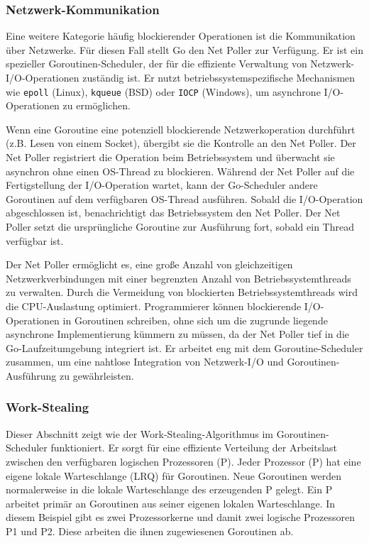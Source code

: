 \documentclass[fontsize=12pt,paper=a4,twoside=semi,parskip=half-,headsepline,headinclude]{scrreprt}
\begin{document}
\subsubsection{Netzwerk-Kommunikation}

Eine weitere Kategorie häufig blockierender Operationen ist die Kommunikation über Netzwerke. Für diesen Fall stellt Go den Net Poller\cite{netpoll2024} zur Verfügung. Er ist ein spezieller Goroutinen-Scheduler, der für die effiziente Verwaltung von Netzwerk-I/O-Operationen zuständig ist. Er nutzt betriebssystemspezifische Mechanismen wie \texttt{epoll} (Linux), \texttt{kqueue} (BSD) oder \texttt{IOCP} (Windows), um asynchrone I/O-Operationen zu ermöglichen.

Wenn eine Goroutine eine potenziell blockierende Netzwerkoperation durchführt (z.B. Lesen von einem Socket), übergibt sie die Kontrolle an den Net Poller. Der Net Poller registriert die Operation beim Betriebssystem und überwacht sie asynchron ohne einen OS-Thread zu blockieren. Während der Net Poller auf die Fertigstellung der I/O-Operation wartet, kann der Go-Scheduler andere Goroutinen auf dem verfügbaren OS-Thread ausführen. Sobald die I/O-Operation abgeschlossen ist, benachrichtigt das Betriebssystem den Net Poller. Der Net Poller setzt die ursprüngliche Goroutine zur Ausführung fort, sobald ein Thread verfügbar ist.

Der Net Poller ermöglicht es, eine große Anzahl von gleichzeitigen Netzwerkverbindungen mit einer begrenzten Anzahl von Betriebssystemthreads zu verwalten. Durch die Vermeidung von blockierten Betriebssystemthreads wird die CPU-Auslastung optimiert. Programmierer können blockierende I/O-Operationen in Goroutinen schreiben, ohne sich um die zugrunde liegende asynchrone Implementierung kümmern zu müssen, da der Net Poller tief in die Go-Laufzeitumgebung integriert ist. Er arbeitet eng mit dem Goroutine-Scheduler zusammen, um eine nahtlose Integration von Netzwerk-I/O und Goroutinen-Ausführung zu gewährleisten. 

\subsubsection{Work-Stealing}
\label{subsubsec:workstealing}

Dieser Abschnitt zeigt wie der Work-Stealing-Algorithmus im Goroutinen-Scheduler funktioniert. Er sorgt für eine effiziente Verteilung der Arbeitslast zwischen den verfügbaren logischen Prozessoren (P). Jeder Prozessor (P) hat eine eigene lokale Warteschlange (LRQ) für Goroutinen. Neue Goroutinen werden normalerweise in die lokale Warteschlange des erzeugenden P gelegt. Ein P arbeitet primär an Goroutinen aus seiner eigenen lokalen Warteschlange. In diesem Beispiel gibt es zwei Prozessorkerne und damit zwei logische Prozessoren P1 und P2. Diese arbeiten die ihnen zugewiesenen Goroutinen ab.
\end{document}
